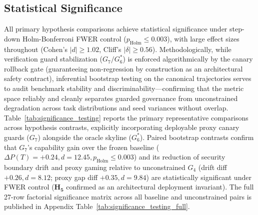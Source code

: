 \documentclass[conference]{IEEEtran}
\begin{document}
\subsection{Statistical Significance}
All primary hypothesis comparisons achieve statistical significance under step-down Holm-Bonferroni FWER control ($p_{\text{Holm}}\le 0.003$), with large effect sizes throughout (Cohen's $|d|\ge 1.02$, Cliff's $|\delta|\ge 0.56$). Methodologically, while verification guard stabilization ($G_7/G_6^*$) is enforced algorithmically by the canary rollback gate (guaranteeing non-regression by construction as an architectural safety contract), inferential bootstrap testing on the canonical trajectories serves to audit benchmark stability and discriminability---confirming that the metric space reliably and cleanly separates guarded governance from unconstrained degradation across task distributions and seed variances without overlap. Table~\ref{tab:significance_testing} reports the primary representative comparisons across hypothesis contrasts, explicitly incorporating deployable proxy canary guards ($G_7$) alongside the oracle skyline ($G_6^*$). Paired bootstrap contrasts confirm that $G_7$'s capability gain over the frozen baseline ($\Delta P(T) = +0.24, d = 12.45, p_{\text{Holm}} \le 0.003$) and its reduction of security boundary drift and proxy gaming relative to unconstrained $G_4$ (drift diff $+0.26, d = 8.12$; proxy gap diff $+0.35, d = 9.84$) are statistically significant under FWER control ($\mathbf{H_5}$ confirmed as an architectural deployment invariant). The full 27-row factorial significance matrix across all baseline and unconstrained pairs is published in Appendix Table~\ref{tab:significance_testing_full}.
\end{document}
